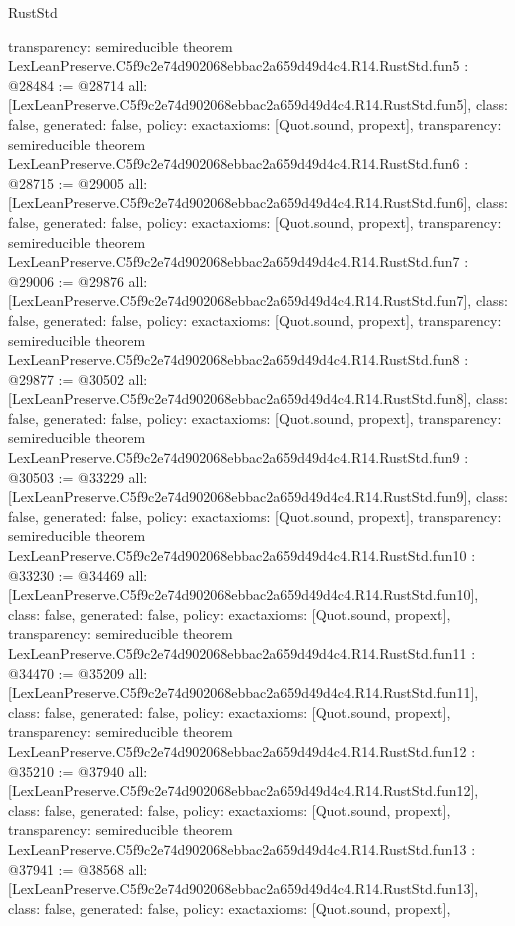 \begin{lexlean}{RustStd}
\begin{coremodule}
{  transparency: semireducible
}
theorem LexLeanPreserve.C5f9c2e74d902068ebbac2a659d49d4c4.R14.RustStd.fun5 : @28484 := @28714 {
  all: [LexLeanPreserve.C5f9c2e74d902068ebbac2a659d49d4c4.R14.RustStd.fun5],
  class: false,
  generated: false,
  policy: exact{axioms: [Quot.sound, propext]},
  transparency: semireducible
}
theorem LexLeanPreserve.C5f9c2e74d902068ebbac2a659d49d4c4.R14.RustStd.fun6 : @28715 := @29005 {
  all: [LexLeanPreserve.C5f9c2e74d902068ebbac2a659d49d4c4.R14.RustStd.fun6],
  class: false,
  generated: false,
  policy: exact{axioms: [Quot.sound, propext]},
  transparency: semireducible
}
theorem LexLeanPreserve.C5f9c2e74d902068ebbac2a659d49d4c4.R14.RustStd.fun7 : @29006 := @29876 {
  all: [LexLeanPreserve.C5f9c2e74d902068ebbac2a659d49d4c4.R14.RustStd.fun7],
  class: false,
  generated: false,
  policy: exact{axioms: [Quot.sound, propext]},
  transparency: semireducible
}
theorem LexLeanPreserve.C5f9c2e74d902068ebbac2a659d49d4c4.R14.RustStd.fun8 : @29877 := @30502 {
  all: [LexLeanPreserve.C5f9c2e74d902068ebbac2a659d49d4c4.R14.RustStd.fun8],
  class: false,
  generated: false,
  policy: exact{axioms: [Quot.sound, propext]},
  transparency: semireducible
}
theorem LexLeanPreserve.C5f9c2e74d902068ebbac2a659d49d4c4.R14.RustStd.fun9 : @30503 := @33229 {
  all: [LexLeanPreserve.C5f9c2e74d902068ebbac2a659d49d4c4.R14.RustStd.fun9],
  class: false,
  generated: false,
  policy: exact{axioms: [Quot.sound, propext]},
  transparency: semireducible
}
theorem LexLeanPreserve.C5f9c2e74d902068ebbac2a659d49d4c4.R14.RustStd.fun10 : @33230 := @34469 {
  all: [LexLeanPreserve.C5f9c2e74d902068ebbac2a659d49d4c4.R14.RustStd.fun10],
  class: false,
  generated: false,
  policy: exact{axioms: [Quot.sound, propext]},
  transparency: semireducible
}
theorem LexLeanPreserve.C5f9c2e74d902068ebbac2a659d49d4c4.R14.RustStd.fun11 : @34470 := @35209 {
  all: [LexLeanPreserve.C5f9c2e74d902068ebbac2a659d49d4c4.R14.RustStd.fun11],
  class: false,
  generated: false,
  policy: exact{axioms: [Quot.sound, propext]},
  transparency: semireducible
}
theorem LexLeanPreserve.C5f9c2e74d902068ebbac2a659d49d4c4.R14.RustStd.fun12 : @35210 := @37940 {
  all: [LexLeanPreserve.C5f9c2e74d902068ebbac2a659d49d4c4.R14.RustStd.fun12],
  class: false,
  generated: false,
  policy: exact{axioms: [Quot.sound, propext]},
  transparency: semireducible
}
theorem LexLeanPreserve.C5f9c2e74d902068ebbac2a659d49d4c4.R14.RustStd.fun13 : @37941 := @38568 {
  all: [LexLeanPreserve.C5f9c2e74d902068ebbac2a659d49d4c4.R14.RustStd.fun13],
  class: false,
  generated: false,
  policy: exact{axioms: [Quot.sound, propext]},
}
\end{coremodule}
\end{lexlean}
